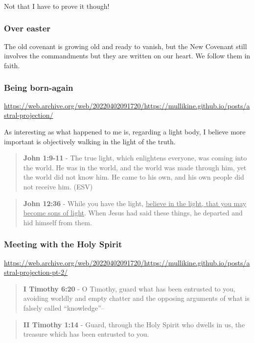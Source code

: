 \documentclass[11pt]{article}
\begin{document}
Not that I have to prove it though!

\subsubsection{Over easter}
\label{sec:org708b160}
The old covenant is growing old and ready to vanish, but the New Covenant still involves the commandments but they are written on our heart.
We follow them in faith.

\subsubsection{Being born-again}
\label{sec:org585cfed}
\url{https://web.archive.org/web/20220402091720/https://mullikine.github.io/posts/astral-projection/}

As interesting as what happened to me is, regarding a light body, I believe more important is objectively walking in the light of the truth.

\begin{quote}
\textbf{John 1:9-11} - The true light, which enlightens everyone, was coming into the world. He was in the world, and the world was made through him, yet the world did not know him. He came to his own, and his own people did not receive him. (ESV)
\end{quote}

\begin{quote}
\textbf{John 12:36} - While you have the light, \uline{believe in the light, that you may become sons of light}. When Jesus had said these things, he departed and hid himself from them.
\end{quote}

\subsubsection{Meeting with the Holy Spirit}
\label{sec:orgfb8c84c}
\url{https://web.archive.org/web/20220402091720/https://mullikine.github.io/posts/astral-projection-pt-2/}

\begin{quote}
\textbf{I Timothy 6:20} - O Timothy, guard what has been entrusted to you, avoiding worldly and empty chatter and the opposing arguments of what is falsely called “knowledge”--
\end{quote}

\begin{quote}
\textbf{II Timothy 1:14} - Guard, through the Holy Spirit who dwells in us, the treasure which has been entrusted to you.
\end{quote}
\end{document}
